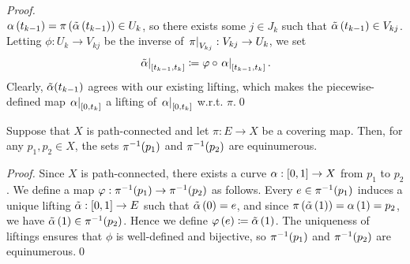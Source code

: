 \documentclass[../Moduli_Spaces_of_Riemann_Surfaces.tex]{subfiles}
\begin{document}
\begin{proof}
{\begin{equation*}
            \end{equation*}
        } $\alpha\left(t_{k-1}\right)=\pi\left(\tilde{\alpha}\left(t_{k-1}\right)\right)\in U_k$, so there exists some $j\in J_k$ such that $\tilde{\alpha}\left(t_{k-1}\right)\in V_{kj}$. Letting $\phi:U_k\to V_{kj}$ be the inverse of $\left.\pi\right|_{V_{kj}}:V_{kj}\to U_k$, we set
        \begin{equation*}
            \left.\tilde{\alpha}\right|_{\left[t_{k-1},t_k\right]}\coloneqq\varphi\circ\left.\alpha\right|_{\left[t_{k-1},t_k\right]}.
        \end{equation*}
        Clearly, $\tilde{\alpha}\!\left(t_{k-1}\right)$ agrees with our existing lifting, which makes the piecewise-defined map $\left.\alpha\right|_{\left[0,t_k\right]}$ a lifting of $\left.\alpha\right|_{\left[0,t_k\right]}$ w.r.t. $\pi$.\qed
    \end{proof}
    \begin{corollary}\label{2.1:cor:fiber_cardinalities_coincide}
        Suppose that $X$ is path-connected and let $\pi:E\to X$ be a covering map. Then, for any $p_1,p_2\in X$, the sets $\pi^{-1}\!\left(p_1\right)$ and $\pi^{-1}\!\left(p_2\right)$ are equinumerous.
    \end{corollary}
    \begin{proof}
        Since $X$ is path-connected, there exists a curve $\alpha:\left[0,1\right]\to X$ from $p_1$ to $p_2$. We define a map $\varphi:\pi^{-1}\!\left(p_1\right)\to\pi^{-1}\!\left(p_2\right)$ as follows. Every $e\in\pi^{-1}\!\left(p_1\right)$ induces a unique lifting $\tilde{\alpha}:\left[0,1\right]\to E$ such that $\tilde{\alpha}\left(0\right)=e$, and since $\pi\left(\tilde{\alpha}\left(1\right)\right)=\alpha\left(1\right)=p_2$, we have $\tilde{\alpha}\left(1\right)\in\pi^{-1}\!\left(p_2\right)$. Hence we define $\varphi\left(e\right)\coloneqq\tilde{\alpha}\left(1\right)$. The uniqueness of liftings ensures that $\phi$ is well-defined and bijective, so $\pi^{-1}\!\left(p_1\right)$ and $\pi^{-1}\!\left(p_2\right)$ are equinumerous.\qed
    \end{proof}
\end{document}
